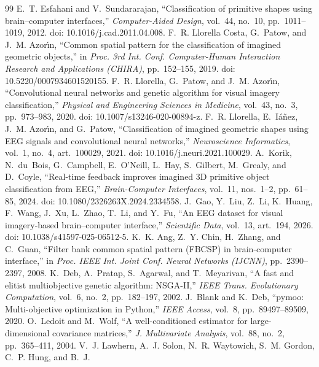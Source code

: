 \documentclass[11pt,a4paper]{article}
\begin{document}
\begin{thebibliography}{99}\small
{} E.~T. Esfahani and V.~Sundararajan, ``Classification of primitive shapes using
brain--computer interfaces,'' \emph{Computer-Aided Design}, vol.~44, no.~10, pp.~1011--1019, 2012.
doi: 10.1016/j.cad.2011.04.008.
 F.~R. Llorella Costa, G.~Patow, and J.~M. Azor\'{\i}n, ``Common spatial pattern for the
classification of imagined geometric objects,'' in \emph{Proc. 3rd Int. Conf. Computer-Human Interaction
Research and Applications (CHIRA)}, pp.~152--155, 2019. doi: 10.5220/0007934601520155.
 F.~R. Llorella, G.~Patow, and J.~M. Azor\'{\i}n, ``Convolutional neural networks and
genetic algorithm for visual imagery classification,'' \emph{Physical and Engineering Sciences in
Medicine}, vol.~43, no.~3, pp.~973--983, 2020. doi: 10.1007/s13246-020-00894-z.
 F.~R. Llorella, E.~I\'a\~nez, J.~M. Azor\'{\i}n, and G.~Patow, ``Classification of
imagined geometric shapes using EEG signals and convolutional neural networks,'' \emph{Neuroscience
Informatics}, vol.~1, no.~4, art.~100029, 2021. doi: 10.1016/j.neuri.2021.100029.
 A.~Korik, N.~du~Bois, G.~Campbell, E.~O'Neill, L.~Hay, S.~Gilbert, M.~Grealy, and
D.~Coyle, ``Real-time feedback improves imagined 3D primitive object classification from EEG,''
\emph{Brain-Computer Interfaces}, vol.~11, nos.~1--2, pp.~61--85, 2024. doi: 10.1080/2326263X.2024.2334558.
 J.~Gao, Y.~Liu, Z.~Li, K.~Huang, F.~Wang, J.~Xu, L.~Zhao, T.~Li, and Y.~Fu, ``An EEG
dataset for visual imagery-based brain--computer interface,'' \emph{Scientific Data}, vol.~13, art.~194,
2026. doi: 10.1038/s41597-025-06512-5.
 K.~K. Ang, Z.~Y. Chin, H.~Zhang, and C.~Guan, ``Filter bank common spatial pattern (FBCSP)
in brain-computer interface,'' in \emph{Proc. IEEE Int. Joint Conf. Neural Networks (IJCNN)},
pp.~2390--2397, 2008.
 K.~Deb, A.~Pratap, S.~Agarwal, and T.~Meyarivan, ``A fast and elitist multiobjective
genetic algorithm: NSGA-II,'' \emph{IEEE Trans. Evolutionary Computation}, vol.~6, no.~2, pp.~182--197, 2002.
 J.~Blank and K.~Deb, ``pymoo: Multi-objective optimization in Python,'' \emph{IEEE Access},
vol.~8, pp.~89497--89509, 2020.
 O.~Ledoit and M.~Wolf, ``A well-conditioned estimator for large-dimensional covariance
matrices,'' \emph{J. Multivariate Analysis}, vol.~88, no.~2, pp.~365--411, 2004.
 V.~J. Lawhern, A.~J. Solon, N.~R. Waytowich, S.~M. Gordon, C.~P. Hung, and B.~J.

\end{thebibliography}
\end{document}
